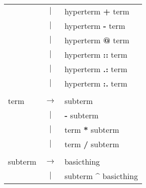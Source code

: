 \begin{tabular}{lcl}
 & $|$ & hyperterm \textbf{+} term \\
 & $|$ & hyperterm \textbf{-} term \\
 & $|$ & hyperterm \textbf{@} term \\
 & $|$ & hyperterm \textbf{::} term \\
 & $|$ & hyperterm \textbf{.:} term \\
 & $|$ & hyperterm \textbf{:.} term \\
 & & \\
term & $\rightarrow$ & subterm \\
 & $|$ & \textbf{-} subterm \\
 & $|$ & term \textbf{*} subterm \\
 & $|$ & term \textbf{/} subterm \\
 & & \\
subterm & $\rightarrow$ & basicthing \\
 & $|$ & subterm \textbf{\^} basicthing \\
\end{tabular}\\
